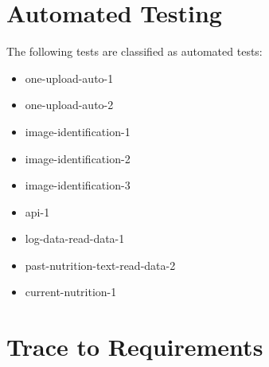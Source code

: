 \documentclass[12pt, titlepage]{article}
\begin{document}
	\section{Automated Testing}

	The following tests are classified as automated tests:
    \begin{itemize}
        \item one-upload-auto-1
        \item one-upload-auto-2
        \item image-identification-1
        \item image-identification-2
        \item image-identification-3
        \item api-1
        \item log-data-read-data-1
        \item past-nutrition-text-read-data-2
        \item current-nutrition-1
    \end{itemize}
	
	\section{Trace to Requirements}
	
\end{document}
